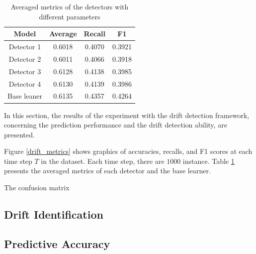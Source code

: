 \begin{table}[]
\centering
\begin{tabular}{c|ccc}
Model       & Average & Recall & F1     \\ \hline
Detector 1  & 0.6018  & 0.4070 & 0.3921 \\
Detector 2  & 0.6011  & 0.4066 & 0.3918 \\
Detector 3  & 0.6128  & 0.4138 & 0.3985 \\
Detector 4  & 0.6130  & 0.4139 & 0.3986 \\ \hline
Base leaner & 0.6135  & 0.4357 & 0.4264
\end{tabular}
\caption{Averaged metrics of the detectors with different parameters}
\label{tabel_drift_metrics}
\end{table}

In this section, the results of the experiment with the drift detection framework, concerning the prediction performance and the drift detection ability, are presented.

Figure \ref{drift_metrics} shows graphics of accuracies, recalls, and F1 scores at each time step $T$ in the dataset. Each time step, there are $1000$ instance. Table \ref{tabel_drift_metrics} presents the averaged metrics of each detector and the base learner.

The confusion matrix


\subsection{Drift Identification}
\subsection{Predictive Accuracy}